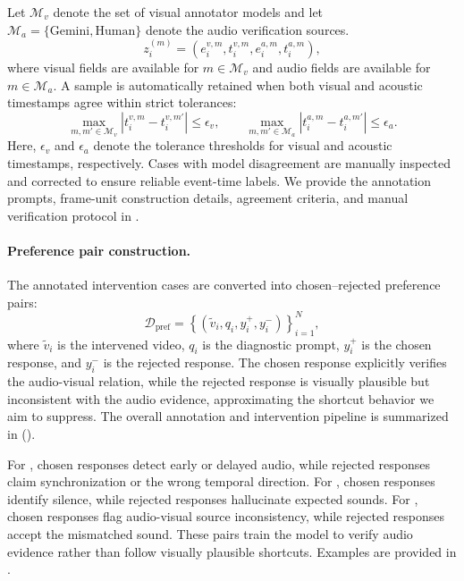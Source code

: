 Let $\mathcal{M}_v$ denote the set of visual annotator models and let $\mathcal{M}_a=\{\mathrm{Gemini}, \mathrm{Human}\}$ denote the audio verification sources.
\begin{equation}
    z_i^{(m)} = 
    \left(
    e_i^{v,m}, t_i^{v,m},
    e_i^{a,m}, t_i^{a,m}
    \right),
\end{equation}
where visual fields are available for $m \in \mathcal{M}_v$ and audio fields are available for $m \in \mathcal{M}_a$. A sample is automatically retained when both visual and acoustic timestamps agree within strict tolerances:
\begin{equation}
    \max_{m,m' \in \mathcal{M}_v}
    \left|t_i^{v,m} - t_i^{v,m'}\right|
    \leq \epsilon_v,
    \qquad
    \max_{m,m' \in \mathcal{M}_a}
    \left|t_i^{a,m} - t_i^{a,m'}\right|
    \leq \epsilon_a.
\end{equation}
Here, $\epsilon_v$ and $\epsilon_a$ denote the tolerance thresholds for visual and acoustic timestamps, respectively. Cases with model disagreement are manually inspected and corrected to ensure reliable event-time labels. We provide the annotation prompts, frame-unit construction details, agreement criteria, and manual verification protocol in .




\paragraph{Preference pair construction.}
The annotated intervention cases are converted into chosen--rejected preference pairs:
\begin{equation}
    \mathcal{D}_{\mathrm{pref}}
    =
    \left\{
    \left(
    \tilde{v}_i, q_i, y_i^+, y_i^-
    \right)
    \right\}_{i=1}^{N},
\end{equation}
where $\tilde{v}_i$ is the intervened video, $q_i$ is the diagnostic prompt, $y_i^+$ is the chosen response, and $y_i^-$ is the rejected response. The chosen response explicitly verifies the audio-visual relation, while the rejected response is visually plausible but inconsistent with the audio evidence, approximating the shortcut behavior we aim to suppress. The overall annotation and intervention pipeline is summarized in  ().

For \shift, chosen responses detect early or delayed audio, while rejected responses claim synchronization or the wrong temporal direction. For \mute, chosen responses identify silence, while rejected responses hallucinate expected sounds. For \swap, chosen responses flag audio-visual source inconsistency, while rejected responses accept the mismatched sound. These pairs train the model to verify audio evidence rather than follow visually plausible shortcuts. Examples are provided in .









